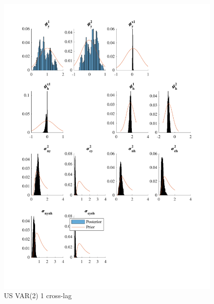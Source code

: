 \documentclass[
  12pt,
]{article}
\begin{document}
\begin{figure}

{\centering \includegraphics[width=0.85\linewidth]{../../Regression/Bayesian_UC_VAR2_nodrift_Crosscycle1lag/OutputData/posteriorpriordistribution_US} 

}

\caption{US VAR(2) 1 cross-lag}\label{fig:unnamed-chunk-13}
\end{figure}
\end{document}
